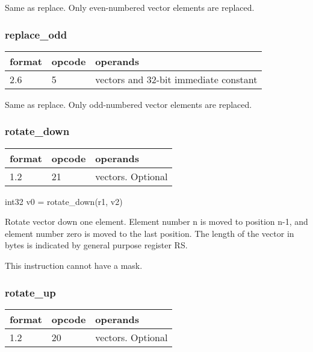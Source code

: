 \documentclass[forwardcom.tex]{subfiles}
\begin{document}
Same as replace. Only even-numbered vector elements are replaced.

\subsubsection{replace\_odd}
\label{table:replaceOddInstruction}
\begin{tabular}{|p{12mm}|p{12mm}|p{110mm}|}
\hline
\bfseries format & \bfseries opcode & \bfseries operands \\ \hline
2.6 & 5 & vectors and 32-bit immediate constant \\ \hline
\end{tabular}
\vspace{2mm}

Same as replace. Only odd-numbered vector elements are replaced.

\subsubsection{rotate\_down}
\label{table:rotateDownInstruction}
\begin{tabular}{|p{12mm}|p{12mm}|p{110mm}|}
\hline
\bfseries format & \bfseries opcode & \bfseries operands \\ \hline
1.2 & 21 & vectors. Optional \\ \hline
\end{tabular}
\vspace{2mm}

int32 v0 = rotate\_down(r1, v2)
\vspace{2mm}

Rotate vector down one element. Element number n is moved to position n-1, and element number zero is moved to the last position. The length of the vector in bytes is indicated by general purpose register RS.
\vspace{2mm}

This instruction cannot have a mask.

\subsubsection{rotate\_up}
\label{table:rotateUpInstruction}
\begin{tabular}{|p{12mm}|p{12mm}|p{110mm}|}
\hline
\bfseries format & \bfseries opcode & \bfseries operands \\ \hline
1.2 & 20 & vectors. Optional \\ \hline
\end{tabular}
\vspace{2mm}
\end{document}
